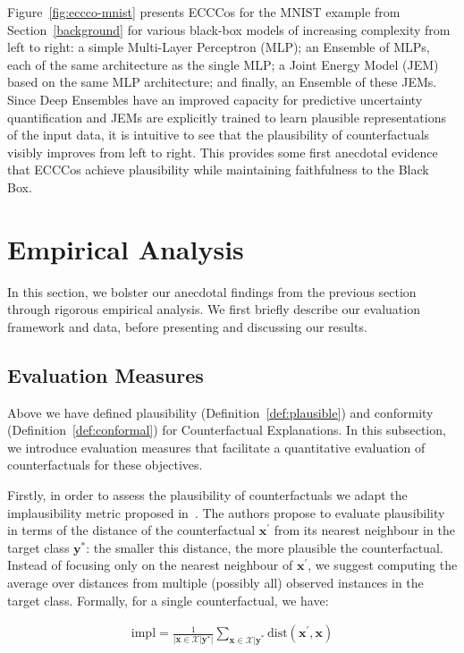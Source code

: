 \documentclass{article}
\begin{document}
Figure~\ref{fig:eccco-mnist} presents ECCCos for the MNIST example from Section~\ref{background} for various black-box models of increasing complexity from left to right: a simple Multi-Layer Perceptron (MLP); an Ensemble of MLPs, each of the same architecture as the single MLP; a Joint Energy Model (JEM) based on the same MLP architecture; and finally, an Ensemble of these JEMs. Since Deep Ensembles have an improved capacity for predictive uncertainty quantification and JEMs are explicitly trained to learn plausible representations of the input data, it is intuitive to see that the plausibility of counterfactuals visibly improves from left to right. This provides some first anecdotal evidence that ECCCos achieve plausibility while maintaining faithfulness to the Black Box. 

\section{Empirical Analysis}\label{emp}

In this section, we bolster our anecdotal findings from the previous section through rigorous empirical analysis. We first briefly describe our evaluation framework and data, before presenting and discussing our results.

\subsection{Evaluation Measures}\label{evaluation}

Above we have defined plausibility (Definition~\ref{def:plausible}) and conformity (Definition~\ref{def:conformal}) for Counterfactual Explanations. In this subsection, we introduce evaluation measures that facilitate a quantitative evaluation of counterfactuals for these objectives. 

Firstly, in order to assess the plausibility of counterfactuals we adapt the implausibility metric proposed in~\citet{guidotti2022counterfactual}. The authors propose to evaluate plausibility in terms of the distance of the counterfactual $\mathbf{x}^{\prime}$ from its nearest neighbour in the target class $\mathbf{y}^*$: the smaller this distance, the more plausible the counterfactual. Instead of focusing only on the nearest neighbour of $\mathbf{x}^{\prime}$, we suggest computing the average over distances from multiple (possibly all) observed instances in the target class. Formally, for a single counterfactual, we have:

\begin{equation}\label{eq:impl}
  \begin{aligned}
    \text{impl} = \frac{1}{\lvert\mathbf{x} \in \mathcal{X}|\mathbf{y}^*\rvert} \sum_{\mathbf{x} \in \mathcal{X}|\mathbf{y}^*} \text{dist}(\mathbf{x}^{\prime},\mathbf{x})
  \end{aligned}
\end{equation}
\end{document}
